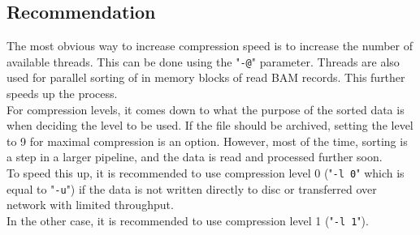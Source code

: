 \subsection{Recommendation}
The most obvious way to increase compression speed is to increase the number of available threads. This can be done using the "\texttt{-@}" parameter. Threads are also used for parallel sorting of in memory blocks of read BAM records. This further speeds up the process. \\
For compression levels, it comes down to what the purpose of the sorted data is when deciding the level to be used. 
If the file should be archived, setting the level to 9 for maximal compression is an option. However, most of the time, sorting is a step in a larger pipeline, and the data is read and processed further soon. \\
To speed this up, it is recommended to use compression level 0 ("\texttt{-l 0}" which is equal to "\texttt{-u}") if the data is not written directly to  disc or transferred over network with limited throughput. \\
In the other case, it is recommended to use compression level 1 ("\texttt{-l 1}").